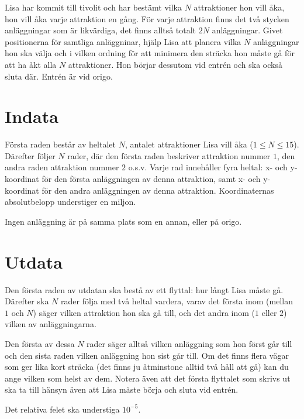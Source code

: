 Lisa har kommit till tivolit och har bestämt vilka $N$ attraktioner hon vill åka, hon vill åka varje attraktion en gång.
För varje attraktion finns det två stycken anläggningar som är likvärdiga, det finns alltså totalt $2N$ anläggningar.
Givet positionerna för samtliga anläggninar, hjälp Lisa att planera vilka $N$ anläggningar hon ska välja och i vilken ordning för att minimera den sträcka hon måste gå för att ha åkt alla $N$ attraktioner.
Hon börjar dessutom vid entrén och ska också sluta där.
Entrén är vid origo.

\section*{Indata}
Första raden består av heltalet $N$, antalet attraktioner Lisa vill åka ($1 \le N \le 15$).
Därefter följer $N$ rader, där den första raden beskriver attraktion nummer $1$, den andra raden attraktion nummer $2$ o.s.v.
Varje rad innehåller fyra heltal: x- och y-koordinat för den första anläggningen av denna attraktion, samt x- och y-koordinat för den andra anläggningen av denna attraktion.
Koordinaternas absolutbelopp understiger en miljon.

Ingen anläggning är på samma plats som en annan, eller på origo.

\section*{Utdata}
Den första raden av utdatan ska bestå av ett flyttal: hur långt Lisa måste gå.
Därefter ska $N$ rader följa med två heltal vardera, varav det första inom (mellan $1$ och $N$) säger vilken attraktion hon ska gå till, och det andra inom ($1$ eller $2$) vilken av anläggningarna.

Den första av dessa $N$ rader säger alltså vilken anläggning som hon först går till och den sista raden vilken anläggning hon sist går till.
Om det finns flera vägar som ger lika kort sträcka (det finns ju åtminstone alltid två håll att gå) kan du ange vilken som helst av dem.
Notera även att det första flyttalet som skrivs ut ska ta till hänsyn även att Lisa måste börja och sluta vid entrén.

Det relativa felet ska understiga $10^{-5}$.
